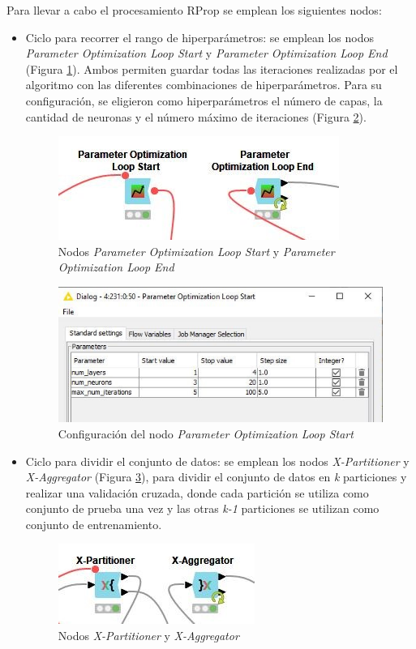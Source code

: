 Para llevar a cabo el procesamiento RProp se emplean los siguientes nodos: 
\begin{itemize}
	\item Ciclo para recorrer el rango de hiperparámetros: se emplean los nodos \textit{Parameter Optimization Loop Start} y \textit{Parameter Optimization Loop End} (Figura \ref{fig:nodos-param-opt-loop}). Ambos permiten guardar todas las iteraciones realizadas por el algoritmo con las diferentes combinaciones de hiperparámetros. Para su configuración, se eligieron como hiperparámetros el número de capas, la cantidad de neuronas y el número máximo de iteraciones (Figura \ref{fig:conf-nodo-param-loop}).
	\begin{figure}[H]
		\centering
		\includegraphics[width=0.5\linewidth]{"figuras/capi 2/nodos-param-opt-loop"}
		\caption[Nodos Parameter Optimization Loop Start y Parameter Optimization Loop End]{Nodos \textit{Parameter Optimization Loop Start} y \textit{Parameter Optimization Loop End}}
		\label{fig:nodos-param-opt-loop}
	\end{figure}
	
	\begin{figure}[H]
		\centering
		\includegraphics[width=0.6\linewidth]{"figuras/capi 2/conf-nodo-param-loop"}
		\caption[Configuración del nodo Parameter Optimization Loop Start]{Configuración del nodo \textit{Parameter Optimization Loop Start}}
		\label{fig:conf-nodo-param-loop}
	\end{figure}
	
	\item Ciclo para dividir el conjunto de datos: se emplean los nodos \textit{X-Partitioner} y \textit{X-Aggregator} (Figura \ref{fig:nodos-cross-val}), para dividir el conjunto de datos en \textit{k} particiones y realizar una validación cruzada, donde cada partición se utiliza como conjunto de prueba una vez y las otras \textit{k-1} particiones se utilizan como conjunto de entrenamiento.
	\begin{figure}[H]
		\centering
		\includegraphics[width=0.4\linewidth]{"figuras/capi 2/nodos-cross-val"}
		\caption[Nodos X-Partitioner y X-Aggregator]{Nodos \textit{X-Partitioner} y \textit{X-Aggregator}}
		\label{fig:nodos-cross-val}
	\end{figure}
	

\end{itemize}
